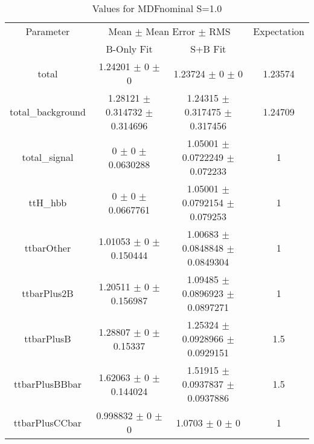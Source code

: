 \begin{table}
\centering
\caption{Values for MDFnominal S=1.0}
\begin{tabular}{cccc}
\toprule
Parameter & \multicolumn{2}{c}{Mean $\pm$ Mean Error $\pm$ RMS} & Expectation\\
 & B-Only Fit & S+B Fit & \\
\midrule
total & \num{1.24201} $\pm$ \num{0} $\pm$ \num{0} & \num{1.23724} $\pm$ \num{0} $\pm$ \num{0} & \num{1.23574}\\
total\_background & \num{1.28121} $\pm$ \num{0.314732} $\pm$ \num{0.314696} & \num{1.24315} $\pm$ \num{0.317475} $\pm$ \num{0.317456} & \num{1.24709}\\
total\_signal & \num{0} $\pm$ \num{0} $\pm$ \num{0.0630288} & \num{1.05001} $\pm$ \num{0.0722249} $\pm$ \num{0.072233} & \num{1}\\
ttH\_hbb & \num{0} $\pm$ \num{0} $\pm$ \num{0.0667761} & \num{1.05001} $\pm$ \num{0.0792154} $\pm$ \num{0.079253} & \num{1}\\
ttbarOther & \num{1.01053} $\pm$ \num{0} $\pm$ \num{0.150444} & \num{1.00683} $\pm$ \num{0.0848848} $\pm$ \num{0.0849304} & \num{1}\\
ttbarPlus2B & \num{1.20511} $\pm$ \num{0} $\pm$ \num{0.156987} & \num{1.09485} $\pm$ \num{0.0896923} $\pm$ \num{0.0897271} & \num{1}\\
ttbarPlusB & \num{1.28807} $\pm$ \num{0} $\pm$ \num{0.15337} & \num{1.25324} $\pm$ \num{0.0928966} $\pm$ \num{0.0929151} & \num{1.5}\\
ttbarPlusBBbar & \num{1.62063} $\pm$ \num{0} $\pm$ \num{0.144024} & \num{1.51915} $\pm$ \num{0.0937837} $\pm$ \num{0.0937886} & \num{1.5}\\
ttbarPlusCCbar & \num{0.998832} $\pm$ \num{0} $\pm$ \num{0} & \num{1.0703} $\pm$ \num{0} $\pm$ \num{0} & \num{1}\\
\bottomrule
\end{tabular}
\end{table}